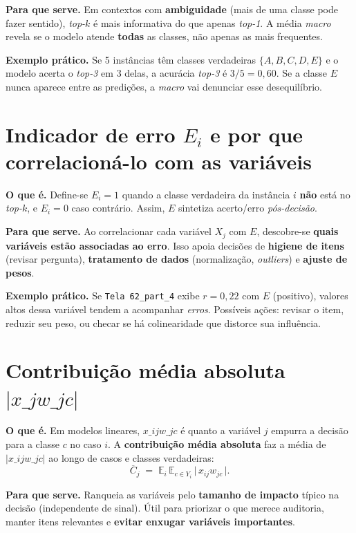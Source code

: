 \documentclass[12pt,a4paper]{article}
\begin{document}
\textbf{Para que serve.} Em contextos com \textbf{ambiguidade} (mais de uma classe pode fazer sentido), \emph{top-$k$} é mais informativa do que apenas \emph{top-1}. A média \emph{macro} revela se o modelo atende \textbf{todas} as classes, não apenas as mais frequentes.

\textbf{Exemplo prático.} Se 5 instâncias têm classes verdadeiras $\{A,B,C,D,E\}$ e o modelo acerta o \emph{top-3} em 3 delas, a acurácia \emph{top-3} é $3/5=0{,}60$. Se a classe $E$ nunca aparece entre as predições, a \emph{macro} vai denunciar esse desequilíbrio.

\section{Indicador de erro $E_i$ e por que correlacioná-lo com as variáveis}
\textbf{O que é.} Define-se $E_i=1$ quando a classe verdadeira da instância $i$ \textbf{não} está no \emph{top-$k$}, e $E_i=0$ caso contrário. Assim, $E$ sintetiza acerto/erro \emph{pós-decisão}.

\textbf{Para que serve.} Ao correlacionar cada variável $X_j$ com $E$, descobre-se \textbf{quais variáveis estão associadas ao erro}. Isso apoia decisões de \textbf{higiene de itens} (revisar pergunta), \textbf{tratamento de dados} (normalização, \emph{outliers}) e \textbf{ajuste de pesos}.

\textbf{Exemplo prático.} Se \texttt{Tela 62\_part\_4} exibe $r=0{,}22$ com $E$ (positivo), valores altos dessa variável tendem a acompanhar \emph{erros}. Possíveis ações: revisar o item, reduzir seu peso, ou checar se há colinearidade que distorce sua influência.

\section{Contribuição média absoluta $|x\_j w\_{jc}|$}
\textbf{O que é.} Em modelos lineares, $x\_{ij}w\_{jc}$ é quanto a variável $j$ empurra a decisão para a classe $c$ no caso $i$. A \textbf{contribuição média absoluta} faz a média de $|x\_{ij}w\_{jc}|$ ao longo de casos e classes verdadeiras:
\begin{equation}
\overline{C}_j \;=\; \mathbb{E}_i\,\mathbb{E}_{c \in Y_i}\,\bigl|\,x_{ij}w_{jc}\,\bigr|.
\end{equation}

\textbf{Para que serve.} Ranqueia as variáveis pelo \textbf{tamanho de impacto} típico na decisão (independente de sinal). Útil para priorizar o que merece auditoria, manter itens relevantes e \textbf{evitar enxugar variáveis importantes}.
\end{document}
